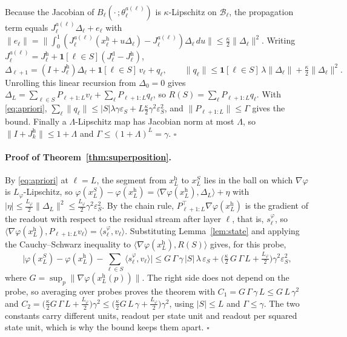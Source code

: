 \documentclass{article}
\theoremstyle{plain}
\theoremstyle{definition}
\theoremstyle{remark}
\newcommand{\host}{\mathrm{h}}
\newcommand{\donor}{\mathrm{d}}
\begin{document}
Because the Jacobian of $B_\ell(\cdot\,;\theta^{a(\ell)}_\ell)$ is
$\kappa$-Lipschitz on $\mathcal{B}_\ell$, the propagation term equals
$J^{a(\ell)}_\ell\Delta_\ell+e_\ell$ with
$\|e_\ell\|=\big\|\int_0^1(J^{a(\ell)}_\ell(x^{\host}_\ell+u\Delta_\ell)-J^{a(\ell)}_\ell)\Delta_\ell\,du\big\|\le\tfrac{\kappa}{2}\|\Delta_\ell\|^2$.
Writing $J^{a(\ell)}_\ell=J^{\host}_\ell+\mathbf{1}[\ell\in S](J^{\donor}_\ell-J^{\host}_\ell)$,
\begin{equation}
\Delta_{\ell+1} = \left(I + J^{\host}_\ell\right)\Delta_\ell + \mathbf{1}[\ell\in S]\, v_\ell + q_\ell,
\qquad
\|q_\ell\| \le \mathbf{1}[\ell\in S]\,\lambda\|\Delta_\ell\| + \tfrac{\kappa}{2}\|\Delta_\ell\|^2 .
\end{equation}
Unrolling this linear recursion from $\Delta_0=0$ gives
$\Delta_L = \sum_{\ell\in S} P_{\ell+1:L} v_\ell + \sum_{\ell} P_{\ell+1:L} q_\ell$,
so $R(S)=\sum_\ell P_{\ell+1:L}q_\ell$. With \eqref{eq:apriori},
$\sum_\ell\|q_\ell\|\le|S|\lambda\gamma\varepsilon_S+L\tfrac{\kappa}{2}\gamma^2\varepsilon_S^2$,
and $\|P_{\ell+1:L}\|\le\Gamma$ gives the bound. Finally a $\Lambda$-Lipschitz
map has Jacobian norm at most $\Lambda$, so $\|I+J^{\host}_k\|\le1+\Lambda$ and
$\Gamma\le(1+\Lambda)^{L}=\gamma$. \hfill$\square$

\paragraph{Proof of Theorem~\ref{thm:superposition}.}
By \eqref{eq:apriori} at $\ell=L$, the segment from $x^{\host}_L$ to $x^{S}_L$
lies in the ball on which $\nabla\varphi$ is $L_\varphi$-Lipschitz, so
$\varphi(x^{S}_L)-\varphi(x^{\host}_L)=\langle\nabla\varphi(x^{\host}_L),\Delta_L\rangle+\eta$
with $|\eta|\le\tfrac{L_\varphi}{2}\|\Delta_L\|^2\le\tfrac{L_\varphi}{2}\gamma^2\varepsilon_S^2$.
By the chain rule, $P_{\ell+1:L}^{\top}\nabla\varphi(x^{\host}_L)$ is the gradient
of the readout with respect to the residual stream after layer $\ell$, that is,
$s^{\varphi}_\ell$, so
$\langle\nabla\varphi(x^{\host}_L),P_{\ell+1:L}v_\ell\rangle=\langle s^{\varphi}_\ell,v_\ell\rangle$.
Substituting Lemma~\ref{lem:state} and applying the Cauchy--Schwarz inequality to
$\langle\nabla\varphi(x^{\host}_L),R(S)\rangle$ gives, for this probe,
\[
\Big|\varphi(x^{S}_L)-\varphi(x^{\host}_L)-\sum_{\ell\in S}\langle s^{\varphi}_\ell,v_\ell\rangle\Big|
\le G\,\Gamma\,\gamma\,|S|\,\lambda\,\varepsilon_S+\Big(\tfrac{\kappa}{2}\,G\,\Gamma\,L+\tfrac{L_\varphi}{2}\Big)\gamma^2\varepsilon_S^2 ,
\]
where $G=\sup_p\|\nabla\varphi(x^{\host}_L(p))\|$. The right side does not
depend on the probe, so averaging over probes proves the theorem with
$C_1=G\,\Gamma\,\gamma\,L\le G\,L\,\gamma^2$ and
$C_2=\big(\tfrac{\kappa}{2}G\,\Gamma\,L+\tfrac{L_\varphi}{2}\big)\gamma^2\le\big(\tfrac{\kappa}{2}G\,L\,\gamma+\tfrac{L_\varphi}{2}\big)\gamma^2$,
using $|S|\le L$ and $\Gamma\le\gamma$. The two constants carry different units,
readout per state unit and readout per squared state unit, which is why the bound
keeps them apart. \hfill$\square$
\end{document}
